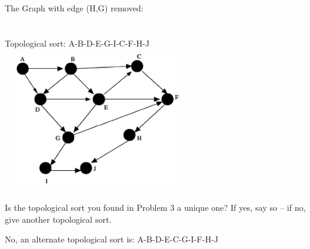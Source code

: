\documentclass[10pt]{article}
\newenvironment{exercise}[2][Exercise]{\begin{trivlist}
\item[\hskip \labelsep {\bfseries #1}\hskip \labelsep {\bfseries #2.}]}{\end{trivlist}}
\newenvironment{solution}[2][Solution]{\begin{trivlist}
\item[\hskip \labelsep {\bfseries #1}\hskip \labelsep {\bfseries #2.}]}{\end{trivlist}}
\theoremstyle{definition}
\begin{document}
\begin{solution}{(3)}
The Graph with edge (H,G) removed:\\
\\
\\Topological sort: A-B-D-E-G-I-C-F-H-J\\
\includegraphics[width=80mm,scale=0.2]{p3impr.PNG}\\



\end{solution}


\begin{exercise}{(4)}
Is the topological sort you found in Problem 3 a unique one? If yes, say so – if no, give another
topological sort.\\
\end{exercise}

\begin{solution}{(4)}
No, an alternate topological sort is:
A-B-D-E-C-G-I-F-H-J
\end{solution}
 
\end{document}

